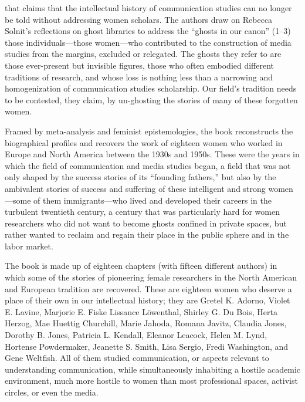 \documentclass{tufte-handout}
\begin{document}




\noindent that claims that the intellectual history of
communication studies can no longer be told without addressing women
scholars. 
The authors draw on Rebecca Solnit's reflections on ghost
libraries to address the ``ghosts in our canon'' (1--3) those
individuals---those women---who contributed to the construction of media
studies from the margins, excluded or relegated. The ghosts they refer
to are those ever-present but invisible figures, those who often
embodied different traditions of research, and whose loss is nothing
less than a narrowing and homogenization of communication studies
scholarship. Our field's tradition needs to be contested, they claim, by
un-ghosting the stories of many of these forgotten women.

Framed by meta-analysis and feminist epistemologies, the book
reconstructs the biographical profiles and recovers the work of eighteen
women who worked in Europe and North America between the 1930s and
1950s. These were the years in which the field of communication and
media studies began, a field that was not only shaped by the success
stories of its ``founding fathers,'' but also by the ambivalent stories
of success and suffering of these intelligent and strong women---some of
them immigrants---who lived and developed their careers in the turbulent
twentieth century, a century that was particularly hard for women
researchers who did not want to become ghosts confined in private
spaces, but rather wanted to reclaim and regain their place in the
public sphere and in the labor market.

The book is made up of eighteen chapters (with fifteen different
authors) in which some of the stories of pioneering female researchers
in the North American and European tradition are recovered. These are
eighteen women who deserve a place of their own in our intellectual
history; they are Gretel K. Adorno, Violet E. Lavine, Marjorie E. Fiske
Lissance Löwenthal, Shirley G. Du Bois, Herta Herzog, Mae Huettig
Churchill, Marie Jahoda, Romana Javitz, Claudia Jones, Dorothy B. Jones,
Patricia L. Kendall, Eleanor Leacock, Helen M. Lynd, Hortense
Powdermaker, Jeanette S. Smith, Lisa Sergio, Fredi Washington, and Gene
Weltfish. All of them studied communication, or aspects relevant to
understanding communication, while simultaneously inhabiting a hostile
academic environment, much more hostile to women than most professional
spaces, activist circles, or even the media.
\end{document}
